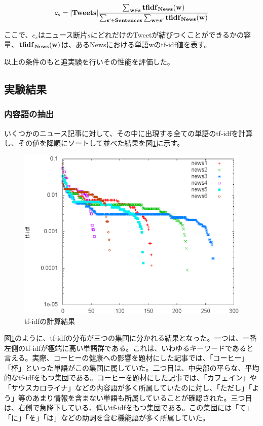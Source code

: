 \documentclass[12pt]{jarticle}
\begin{document}
\begin{equation}
  c_{s} =  |\bf{Tweets}| \frac{\sum _{w \in s} \bf{tfidf}_{News}(w)}{\sum _{s' \in \bf{Sentences}} \sum _{w \in s'} \bf{tfidf}_{News}(w)}
\end{equation}

ここで、$c_s$はニュース断片$s$にどれだけのTweetが結びつくことができるかの容量、$\bf{tfidf}_{News}(w)$は、あるNewsにおける単語wのtf-idf値を表す。

以上の条件のもと追実験を行いその性能を評価した。

\subsection{実験結果}
\subsubsection{内容語の抽出}

いくつかのニュース記事に対して、その中に出現する全ての単語のtf-idfを計算し、その値を降順にソートして並べた結果を図\ref{content_word}に示す。

\begin{figure}[htbp]
  \begin{center}
    \includegraphics[scale = 0.5]{image/content_word.eps}
  \end{center}
  \label{content_word}
  \caption{tf-idfの計算結果}

\end{figure}

図\ref{content_word}のように、tf-idfの分布が三つの集団に分かれる結果となった。一つは、一番左側のtf-idfが極端に高い単語群である。これは、いわゆるキーワードであると言える。実際、コーヒーの健康への影響を題材にした記事では、「コーヒー」「杯」といった単語がこの集団に属していた。二つ目は、中央部の平らな、平均的なtf-idfをもつ集団である。コーヒーを題材にした記事では、「カフェイン」や「サウスカロライナ」などの内容語が多く所属していたのに対し、「ただし」「よう」等のあまり情報を含まない単語も所属していることが確認された。三つ目は、右側で急降下している、低いtf-idfをもつ集団である。この集団には「て」「に」「を」「は」などの助詞を含む機能語が多く所属していた。
\end{document}
